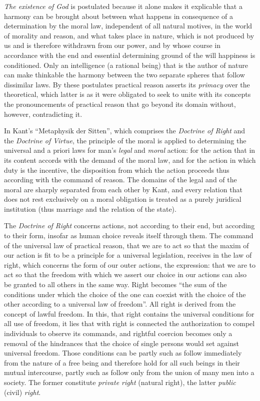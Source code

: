 \emph{The existence of God} is postulated because it alone makes it
explicable that a harmony can be brought about between what happens in
consequence of a determination by the moral law, independent of all
natural motives, in the world of morality and reason, and what takes
place in nature, which is not produced by us and is therefore withdrawn
from our power, and by whose course in accordance with the end and
essential determining ground of the will happiness is conditioned. Only
an intelligence (a rational being) that is the author of nature can make
thinkable the harmony between the two separate spheres that follow
dissimilar laws. By these postulates practical reason asserts its
\emph{primacy} over the theoretical, which latter is as it were obligated
to seek to unite with its concepts the pronouncements of practical
reason that go beyond its domain without, however, contradicting it.

In Kant's ``Metaphysik der Sitten'', which comprises the \emph{Doctrine
of Right} and the \emph{Doctrine of Virtue}, the principle of the moral
is applied to determining the universal and a priori laws for
man's \emph{legal} and \emph{moral} action: for the action that in its
content accords with the demand of the moral law, and for the action in
which duty is the incentive, the disposition from which the action
proceeds thus according with the command of reason. The domains of the
legal and of the moral are sharply separated from each other by Kant,
and every relation that does not rest exclusively on a moral obligation
is treated as a purely juridical institution (thus marriage and the
relation of the state).

The \emph{Doctrine of Right} concerns actions, not according to their
end, but according to their form, insofar as human choice reveals itself
through them. The command of the universal law of practical reason, that
we are to act so that the maxim of our action is fit to be a principle
for a universal legislation, receives in the law of right, which
concerns the form of our outer actions, the expression: that we are to
act so that the freedom with which we assert our choice in our actions
can also be granted to all others in the same way. Right becomes ``the
sum of the conditions under which the choice of the one can coexist
with the choice of the other according to a universal law of freedom''.
All right is derived from the concept of lawful freedom. In this, that
right contains the universal conditions for all use of freedom, it lies
that with right is connected the authorization to compel individuals to
observe its commands, and rightful coercion becomes only a removal of
the hindrances that the choice of single persons would set against
universal freedom. Those conditions can be partly such as follow
immediately from the nature of a free being and therefore hold for all
such beings in their mutual intercourse, partly such as follow only from
the union of many men into a society. The former constitute
\emph{private right} (natural right), the latter \emph{public} (civil)
\emph{right}.

